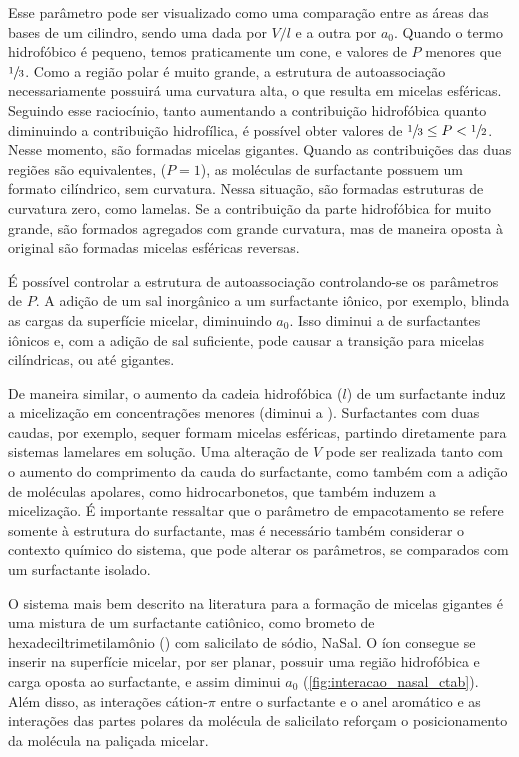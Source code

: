 	Esse parâmetro pode ser visualizado como uma comparação entre as áreas das bases de um cilindro, sendo uma dada por \({V}/{l}\) e a outra por \(a_0\). Quando o termo hidrofóbico é pequeno, temos praticamente um cone, e valores de \(P\) menores que \(\sfrac{1}{3}\). Como a região polar é muito grande, a estrutura de autoassociação necessariamente possuirá uma curvatura alta, o que resulta em micelas esféricas. Seguindo esse raciocínio, tanto aumentando a contribuição hidrofóbica quanto diminuindo a contribuição hidrofílica, é possível obter valores de \(\sfrac{1}{3} \leq P < \sfrac{1}{2}\). Nesse momento, são formadas micelas gigantes. Quando as contribuições das duas regiões são equivalentes, (\(P = 1\)), as moléculas de surfactante possuem um formato cilíndrico, sem curvatura. Nessa situação, são formadas estruturas de curvatura zero, como lamelas. Se a contribuição da parte hidrofóbica for muito grande, são formados agregados com grande curvatura, mas de maneira oposta à original são formadas micelas esféricas reversas. 
	
	
	É possível controlar a estrutura de autoassociação controlando-se os parâmetros de \(P\). A adição de um sal inorgânico a um surfactante iônico, por exemplo, blinda as cargas da superfície micelar, diminuindo \(a_0\). Isso diminui a \cmc{} de surfactantes iônicos e, com a adição de sal suficiente, pode causar a transição para micelas cilíndricas, ou até gigantes. 
	
	De maneira similar, o aumento da cadeia hidrofóbica (\(l\)) de um surfactante induz a micelização em concentrações menores (diminui a \cmc). Surfactantes com duas caudas, por exemplo, sequer formam micelas esféricas, partindo diretamente para sistemas lamelares em solução. Uma alteração de \(V\) pode ser realizada tanto com o aumento do comprimento da cauda do surfactante, como também com a adição de moléculas apolares, como hidrocarbonetos, que também induzem a micelização. É importante ressaltar que o parâmetro de empacotamento se refere somente à estrutura do surfactante, mas é necessário também considerar o contexto químico do sistema, que pode alterar os parâmetros, se comparados com um surfactante isolado. 
	
	O sistema mais bem descrito na literatura para a formação de micelas gigantes é uma mistura de um surfactante catiônico, como brometo de hexadeciltrimetilamônio (\CTAB) com salicilato de sódio, NaSal. O íon \Sal{} consegue se inserir na superfície micelar, por ser planar, possuir uma região hidrofóbica e carga oposta ao surfactante, e assim diminui \(a_0\) (\ref{fig:interacao_nasal_ctab}). Além disso, as interações cátion-\(\pi\) entre o surfactante e o anel aromático e as interações das partes polares da molécula de salicilato reforçam o posicionamento da molécula na paliçada micelar.  
	
